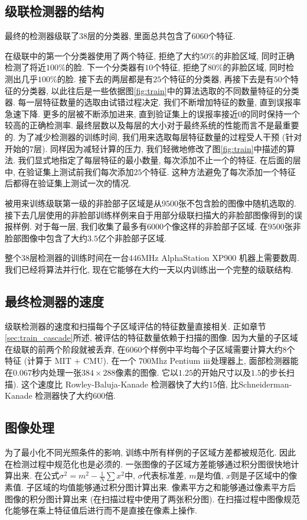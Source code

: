 \documentclass[a4paper,utf8,11pt]{ctexart}
\newcommand{\RN}[1]{%
  \textup{\uppercase\expandafter{\romannumeral#1}}%
}
\begin{document}
\subsection{级联检测器的结构}
最终的检测器级联了$38$层的分类器, 里面总共包含了$6060$个特征.

在级联中的第一个分类器使用了两个特征, 拒绝了大约$50\%$的非脸区域, 同时正确检测了将近$100\%$的脸. 下一个分类器有$10$个特征, 拒绝了$80\%$的非脸区域, 同时检测出几乎$100\%$的脸.
接下去的两层都是有$25$个特征的分类器, 再接下去是有$50$个特征的分类器, 以此往后是一些依据图\ref{fig:train}中的算法选取的不同数量特征的分类器. 每一层特征数量的选取由试错过程决定. 我们不断增加特征的数量, 直到误报率急速下降. 更多的层被不断添加进来, 直到验证集上的误报率接近$0$的同时保持一个较高的正确检测率. 最终层数以及每层的大小对于最终系统的性能而言不是最重要的.
为了减少检测器的训练时间, 我们用来选取每层特征数量的过程受人干预 (针对开始的$7$层). 同样因为减轻计算的压力, 我们轻微地修改了图\ref{fig:train}中描述的算法. 我们显式地指定了每层特征的最小数量, 每次添加不止一个的特征. 在后面的层中, 在验证集上测试前我们每次添加$25$个特征.
这种方法避免了每次添加一个特征后都得在验证集上测试一次的情况.

被用来训练级联第一级的非脸部子区域是从$9500$张不包含脸的图像中随机选取的. 接下去几层使用的非脸部训练样例来自于用部分级联扫描大的非脸部图像得到的误报样例. 对于每一层, 我们收集了最多有$6000$个像这样的非脸部子区域. 在$9500$张非脸部图像中包含了大约$3.5$亿个非脸部子区域.

整个$38$层检测器的训练时间在一台$446$MHz AlphaStation XP900 机器上需要数周. 我们已经将算法并行化, 现在它能够在大约一天以内训练出一个完整的级联结构.

\subsection{最终检测器的速度}
级联检测器的速度和扫描每个子区域评估的特征数量直接相关. 正如章节\ref{sec:train_cascade}所述, 被评估的特征数量依赖于扫描的图像. 因为大量的子区域在级联的前两个阶段就被丢弃, 在$6060$个样例中平均每个子区域需要计算大约$8$个特征 (计算于 MIT + CMU\citep{rowley1998neural}). 在一个 $700$Mhz Pentium $\RN{3}$处理器上, 面部检测器能在$0.067$秒内处理一张$384\times288$像素的图像. 它以$1.25$的开始尺寸以及$1.5$的步长扫描). 这个速度比 Rowley-Baluja-Kanade 检测器\citep{rowley1998neural}快了大约$15$倍, 比Schneiderman-Kanade 检测器\citet{schneiderman2000statistical}快了大约$600$倍.

\subsection{图像处理}
为了最小化不同光照条件的影响, 训练中所有样例的子区域方差都被规范化. 因此在检测过程中规范化也是必须的. 一张图像的子区域方差能够通过积分图很快地计算出来. 在公式$\sigma^2=m^2-\frac1N\sum x^2$中, $\sigma$代表标准差, $m$是均值, $x$则是子区域中的像素值. 子区域的均值能够通过积分图计算出来. 像素平方之和能够通过像素平方后图像的积分图计算出来 (在扫描过程中使用了两张积分图).
在扫描过程中图像规范化能够在乘上特征值后进行而不是直接在像素上操作.
\end{document}
